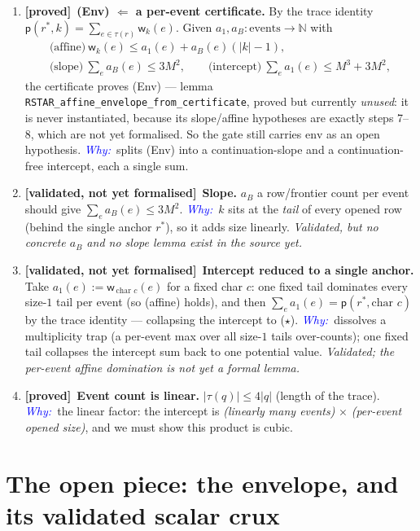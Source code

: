 \documentclass[11pt]{article}
\newcommand{\rs}[1]{\lvert #1\rvert}                 %
\newcommand{\pot}{\mathsf{p}}                        %
\newcommand{\tr}{\tau}                               %
\newcommand{\wt}{\mathsf{w}}                          %
\newcommand{\GREEN}{\textcolor{green!55!black}{\textbf{[proved]}}}
\newcommand{\VALID}{\textcolor{orange!85!black}{\textbf{[validated, not yet formalised]}}}
\newcommand{\WHY}{\textit{\textcolor{blue}{Why:\ }}}
\theoremstyle{definition}
\begin{document}
\begin{enumerate}[leftmargin=1.6em,itemsep=5pt]
\item \GREEN\ \textbf{(Env) $\Leftarrow$ a per-event certificate.} By the trace identity $\pot(r^{*},k)=\sum_{e\in\tr(r)}\wt_k(e)$.
Given $a_1,a_B:\text{events}\to\mathbb N$ with
\begin{gather*}
\text{(affine)}\ \wt_k(e)\le a_1(e)+a_B(e)(\rs k-1),\\
\text{(slope)}\ \textstyle\sum_e a_B(e)\le 3M^2,\qquad
\text{(intercept)}\ \textstyle\sum_e a_1(e)\le M^3+3M^2,
\end{gather*}
the certificate proves (Env) --- lemma \texttt{RSTAR\_affine\_envelope\_from\_certificate}, proved but currently
\emph{unused}: it is never instantiated, because its slope/affine hypotheses are exactly steps 7--8, which are not yet
formalised. So the gate still carries $\mathrm{env}$ as an open hypothesis.
\WHY splits (Env) into a continuation-slope and a continuation-free intercept, each a single sum.

\item \VALID\ \textbf{Slope.} $a_B$ a row/frontier count per event should give $\sum_e a_B(e)\le3M^2$.
\WHY $k$ sits at the \emph{tail} of every opened row (behind the single anchor $r^{*}$), so it adds size linearly.
\emph{Validated, but no concrete $a_B$ and no slope lemma exist in the source yet.}

\item \VALID\ \textbf{Intercept reduced to a single anchor.} Take $a_1(e):=\wt_{\,\text{char }c}(e)$ for a fixed char $c$:
one fixed tail dominates every size-$1$ tail per event (so (affine) holds), and then
$\sum_e a_1(e)=\pot(r^{*},\text{char }c)$ by the trace identity --- collapsing the intercept to ($\star$).
\WHY dissolves a multiplicity trap (a per-event max over all size-$1$ tails over-counts); one fixed tail collapses the
intercept sum back to one potential value. \emph{Validated; the per-event affine domination is not yet a formal lemma.}

\item \GREEN\ \textbf{Event count is linear.} $\rs{\tr(q)}\le 4\rs q$ (length of the trace).
\WHY the linear factor: the intercept is \emph{(linearly many events)} $\times$ \emph{(per-event opened size)}, and we
must show this product is cubic.

\end{enumerate}

\section{The open piece: the envelope, and its validated scalar crux}\label{sec:open}
\end{document}
